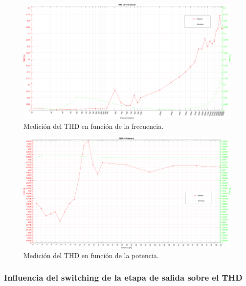 \begin{figure}[H]
    \centering
    \includegraphics[height=0.65 \textwidth, angle=90]{img/mediciones/THD/THD_vs_frequency.png}
    \caption{Medición del THD en función de la frecuencia.}
    \label{fig:THD_vs_freq}
\end{figure}

\clearpage

\begin{figure}[H]
    \centering
    \includegraphics[height=0.65 \textwidth, angle=90]{img/mediciones/THD/THD_vs_power.png}
    \caption{Medición del THD en función de la potencia.}
    \label{fig:THD_vs_power}
\end{figure}

\clearpage


\subsubsection{Influencia del switching de la etapa de salida sobre el THD}

